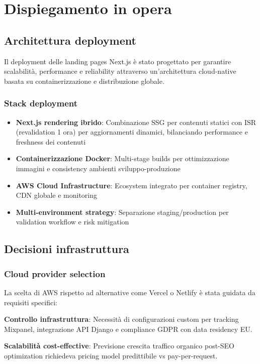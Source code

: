 \chapter{Dispiegamento in opera}

\section{Architettura deployment}
Il deployment delle landing pages Next.js è stato progettato per garantire 
scalabilità, performance e reliability attraverso un'architettura cloud-native 
basata su containerizzazione e distribuzione globale.

\subsection{Stack deployment}
\begin{itemize}
  \item \textbf{Next.js rendering ibrido}: Combinazione SSG per contenuti statici 
  con ISR (revalidation 1 ora) per aggiornamenti dinamici, bilanciando performance 
  e freshness dei contenuti
  \item \textbf{Containerizzazione Docker}: Multi-stage builds per ottimizzazione 
  immagini e consistency ambienti sviluppo-produzione
  \item \textbf{AWS Cloud Infrastructure}: Ecosystem integrato per container 
  registry, CDN globale e monitoring
  \item \textbf{Multi-environment strategy}: Separazione staging/production per 
  validation workflow e risk mitigation
\end{itemize}

\section{Decisioni infrastruttura}

\subsection{Cloud provider selection}
La scelta di AWS rispetto ad alternative come Vercel o Netlify è stata guidata 
da requisiti specifici:

\textbf{Controllo infrastruttura}: Necessità di configurazioni custom per tracking 
Mixpanel, integrazione API Django e compliance GDPR con data residency EU.

\textbf{Scalabilità cost-effective}: Previsione crescita traffico organico post-SEO 
optimization richiedeva pricing model predittibile vs pay-per-request.

